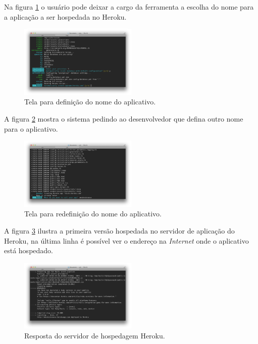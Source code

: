 Na figura \ref{fig:fig8} o usu\'ario pode deixar a cargo da ferramenta a escolha do nome para a aplica\c{c}\~ao a ser hospedada no Heroku.

\begin{figure}[h]
  \centering
  \includegraphics[width=0.5\textwidth]{./fig/setup3}
  \caption{Tela para defini\c{c}\~ao do nome do aplicativo.}
  \label{fig:fig8}
\end{figure}

\pagebreak

A figura \ref{fig:fig9} mostra o sistema pedindo ao desenvolvedor que defina outro nome para o aplicativo.

\begin{figure}[h]
  \centering
  \includegraphics[width=0.5\textwidth]{./fig/setup4}
  \caption{Tela para redefini\c{c}\~ao do nome do aplicativo.}
  \label{fig:fig9}
\end{figure}

A figura \ref{fig:fig10} ilustra a primeira vers\~ao hospedada no servidor de aplica\c{c}\~ao do Heroku, na \'ultima linha \'e poss\'ivel ver o endere\c{c}o na \emph{Internet} onde o aplicativo est\'a hospedado.

\begin{figure}[h]
  \centering
  \includegraphics[width=0.5\textwidth]{./fig/setup5}
  \caption{Resposta do servidor de hospedagem Heroku.}
  \label{fig:fig10}
\end{figure}

